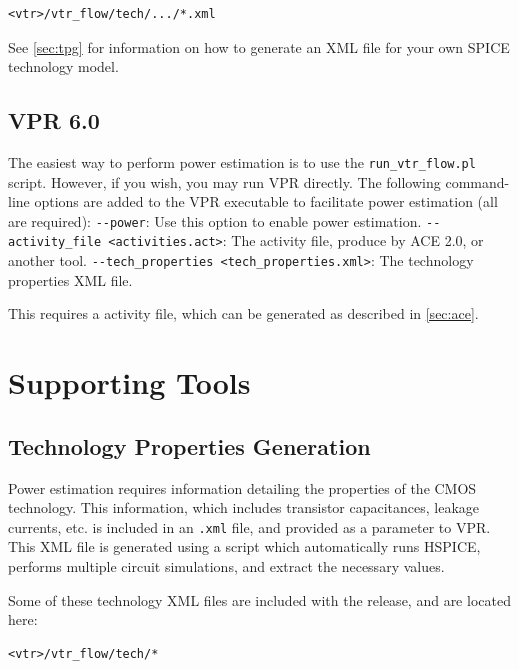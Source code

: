 \documentclass[letterpaper,twoside,10pt]{article}
\begin{document}
\begin{BVerbatim}[bgcolor=LightGray, boxwidth=\textwidth]
<vtr>/vtr_flow/tech/.../*.xml
\end{BVerbatim}

See \autoref{sec:tpg} for information on how to generate an XML file for your own SPICE technology model.

\subsection{VPR 6.0}
The easiest way to perform power estimation is to use the \texttt{run\_vtr\_flow.pl} script.  However, if you wish, you may run VPR directly.
The following command-line options are added to the VPR executable to facilitate power estimation (all are required): \newline
\texttt{\--\--power}:  Use this option to enable power estimation. \newline
\texttt{\--\--activity\_file <activities.act>}: The activity file, produce by ACE 2.0, or another tool. \newline
\texttt{\--\--tech\_properties <tech\_properties.xml>}: The technology properties XML file.

This requires a activity file, which can be generated as described in \autoref{sec:ace}.

\newpage
\section{Supporting Tools} \label{sec:tools}
\subsection{Technology Properties Generation} \label{sec:tpg}
Power estimation requires information detailing the properties of the CMOS technology.  
This information, which includes transistor capacitances, leakage currents, etc. is included in an \texttt{.xml} file, and provided as a parameter to VPR.
This XML file is generated using a script which automatically runs HSPICE, performs multiple circuit simulations, and extract the necessary values.


Some of these technology XML files are included with the release, and are located here: 

\begin{BVerbatim}[bgcolor=LightGray, boxwidth=\textwidth]
<vtr>/vtr_flow/tech/*
\end{BVerbatim}
			
\end{document}
